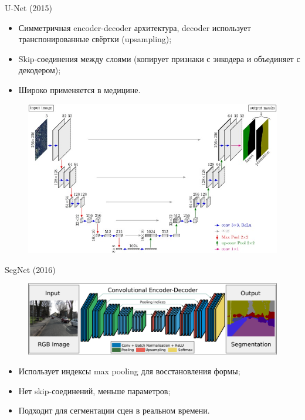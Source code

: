 \documentclass[notheorems, handout]{beamer}
\begin{document}
\begin{frame}{U-Net (2015)}
    \begin{itemize}
        \item Симметричная encoder-decoder архитектура, decoder использует транспонированные свёртки (upsampling);
        \item Skip-соединения между слоями (копирует признаки с энкодера и объединяет с декодером);
        \item Широко применяется в медицине.
    \end{itemize}

    \begin{figure}
        \includegraphics[width=0.8\linewidth]{img/u_net.jpg}    
    \end{figure}
\end{frame}

\begin{frame}{SegNet (2016)}
    \begin{figure}
        \includegraphics[width=\linewidth]{img/segnet.png}
    \end{figure}

    \begin{itemize}
        \item Использует индексы max pooling для восстановления формы;
        \item Нет skip-соединений, меньше параметров;
        \item Подходит для сегментации сцен в реальном времени.
    \end{itemize}
\end{frame}
\end{document}
